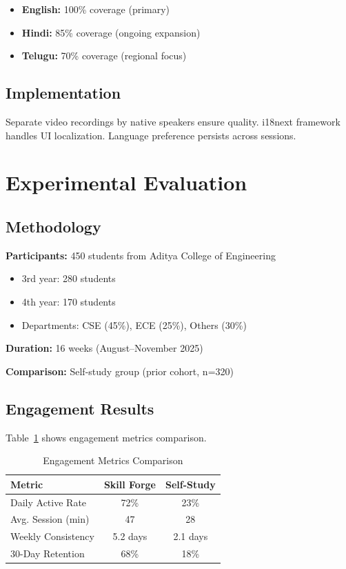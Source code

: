 \documentclass[conference]{IEEEtran}
\begin{document}
\begin{itemize}
    \item \textbf{English:} 100\% coverage (primary)
    \item \textbf{Hindi:} 85\% coverage (ongoing expansion)
    \item \textbf{Telugu:} 70\% coverage (regional focus)
\end{itemize}

\subsection{Implementation}

Separate video recordings by native speakers ensure quality. i18next framework handles UI localization. Language preference persists across sessions.

\section{Experimental Evaluation}

\subsection{Methodology}

\textbf{Participants:} 450 students from Aditya College of Engineering
\begin{itemize}
    \item 3rd year: 280 students
    \item 4th year: 170 students
    \item Departments: CSE (45\%), ECE (25\%), Others (30\%)
\end{itemize}

\textbf{Duration:} 16 weeks (August--November 2025)

\textbf{Comparison:} Self-study group (prior cohort, n=320)

\subsection{Engagement Results}

Table~\ref{tab:engagement} shows engagement metrics comparison.

\begin{table}[htbp]
\caption{Engagement Metrics Comparison}
\label{tab:engagement}
\centering
\begin{tabular}{lcc}
\toprule
\textbf{Metric} & \textbf{Skill Forge} & \textbf{Self-Study} \\
\midrule
Daily Active Rate & 72\% & 23\% \\
Avg. Session (min) & 47 & 28 \\
Weekly Consistency & 5.2 days & 2.1 days \\
30-Day Retention & 68\% & 18\% \\
\bottomrule
\end{tabular}
\end{table}
\end{document}
